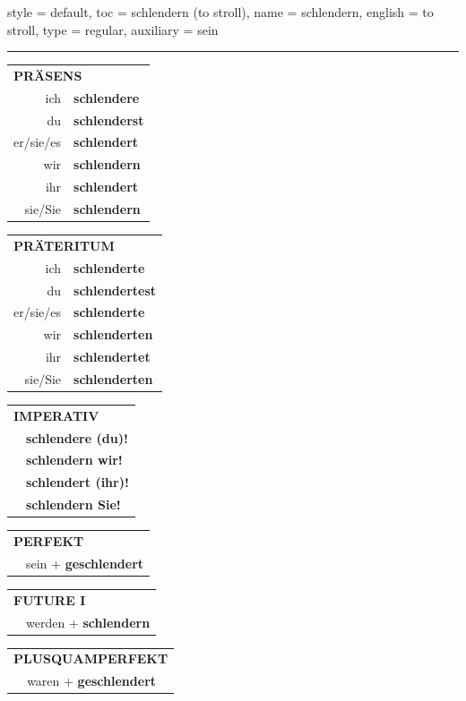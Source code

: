 \begin{verbentry}{
  style = {default},
  toc = {schlendern (to stroll)},
  name = {schlendern},
  english = {to stroll},
  type = {regular},
  auxiliary = {sein}
}


\vspace{5pt}
\hrule
\vspace{5pt}

\begin{tabular}{rl}
\multicolumn{2}{l}{\textbf{PRÄSENS}}\\
ich & \textbf{schlendere}\\
du & \textbf{schlenderst}\\
er/sie/es & \textbf{schlendert}\\
wir & \textbf{schlendern}\\
ihr & \textbf{schlendert}\\
sie/Sie & \textbf{schlendern}\\
\end{tabular}
\hfill
\begin{tabular}{rl}
\multicolumn{2}{l}{\textbf{PRÄTERITUM}}\\
ich & \textbf{schlenderte}\\
du & \textbf{schlendertest}\\
er/sie/es & \textbf{schlenderte}\\
wir & \textbf{schlenderten}\\
ihr & \textbf{schlendertet}\\
sie/Sie & \textbf{schlenderten}\\
\end{tabular}
\hfill
\begin{tabular}{rl}
\multicolumn{2}{l}{\textbf{IMPERATIV}}\\
& \textbf{schlendere (du)!}\\
& \textbf{schlendern wir!}\\
& \textbf{schlendert (ihr)!}\\
& \textbf{schlendern Sie!}\\
\end{tabular}

\vspace{10pt}

\begin{tabular}{rl}
\multicolumn{2}{l}{\textbf{PERFEKT}}\\
& sein + \textbf{geschlendert}\\
\end{tabular}
\hfill
\begin{tabular}{rl}
\multicolumn{2}{l}{\textbf{FUTURE I}}\\
& werden + \textbf{schlendern}\\
\end{tabular}
\hfill
\begin{tabular}{rl}
\multicolumn{2}{l}{\textbf{PLUSQUAMPERFEKT}}\\
& waren + \textbf{geschlendert}\\
\end{tabular}


\end{verbentry}
